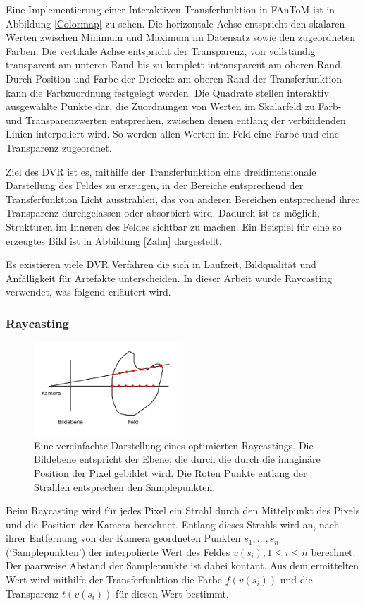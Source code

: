 \documentclass[a4paper,fontsize=12pt,toc=bib,halfparskip]{scrartcl}
\begin{document}
Eine Implementierung einer Interaktiven Transferfunktion in FAnToM ist in Abbildung \ref{Colormap} zu sehen. Die horizontale Achse entspricht den skalaren Werten zwischen Minimum und Maximum im Datensatz sowie den zugeordneten Farben. Die vertikale Achse entspricht der Transparenz, von vollst\"andig transparent am unteren Rand bis zu komplett intransparent am oberen Rand. Durch Position und Farbe der Dreiecke am oberen Rand der Transferfunktion kann die Farbzuordnung festgelegt werden. Die Quadrate stellen interaktiv ausgew\"ahlte Punkte dar, die Zuordnungen von Werten im Skalarfeld zu Farb- und Transparenzwerten entsprechen, zwischen denen entlang der verbindenden Linien interpoliert wird. So werden allen Werten im Feld eine Farbe und eine Transparenz zugeordnet. 

Ziel des DVR ist es, mithilfe der Transferfunktion eine dreidimensionale Darstellung des Feldes zu erzeugen, in der Bereiche entsprechend der Transferfunktion Licht ausstrahlen, das von anderen Bereichen entsprechend ihrer Transparenz durchgelassen oder absorbiert wird. Dadurch ist es m\"oglich, Strukturen im Inneren des Feldes sichtbar zu machen. Ein Beispiel f\"ur eine so erzeugtes Bild ist in Abbildung \ref{Zahn} dargestellt.

Es existieren viele DVR Verfahren die sich in Laufzeit, Bildqualit\"at und Anf\"alligkeit f\"ur Artefakte unterscheiden. In dieser Arbeit wurde Raycasting verwendet, was folgend erl\"autert wird.

\subsubsection{Raycasting}
\begin{figure}
	\centering
	\includegraphics[width=0.5\textwidth]{pictures/Raycasting}
	\caption{Eine vereinfachte Darstellung eines optimierten Raycastings. Die Bildebene entspricht der Ebene, die durch die durch die imagin\"are Position der Pixel gebildet wird. Die Roten Punkte entlang der Strahlen entsprechen den Samplepunkten.}
	\label{Raycasting}
\end{figure}
Beim Raycasting wird f\"ur jedes Pixel ein Strahl durch den Mittelpunkt des Pixels und die Position der Kamera berechnet. Entlang dieses Strahls wird an, nach ihrer Entfernung von der Kamera geordneten Punkten  $s_1, \dots, s_n$ (`Samplepunkten') der interpolierte Wert des Feldes $v(s_i), 1\leq i\leq n$ berechnet. Der paarweise Abstand der Samplepunkte ist dabei kontant. Aus dem ermittelten Wert wird mithilfe der Transferfunktion die Farbe $f(v(s_i))$ und die Transparenz $t(v(s_i))$ f\"ur diesen Wert bestimmt.
\end{document}
